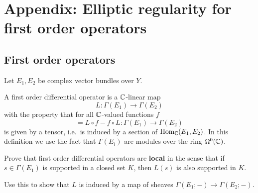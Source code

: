 \section*{\textbf{Appendix: Elliptic regularity for first order
    operators}}
\subsection*{First order operators}
\begin{defn}
  Let $E_{1},E_{2}$ be complex vector bundles over $Y$.
  
  A first order differential operator is a $\mathbb{C}$-linear map
  \begin{equation*}
    L:\Gamma(E_{1})\to \Gamma(E_{2})
  \end{equation*}
  with the property that for all $\mathbb{C}$-valued functions $f$
  \begin{equation*}
    [L,f]=L\circ f-f\circ L:\Gamma(E_{1})\to \Gamma(E_{2})
  \end{equation*}
  is given by a tensor, i.e.\ is induced by a section of $\operatorname{\mathrm{Hom}}_{\mathbb{C}}(E_{1},E_{2})$. In this definition we use the fact that $\Gamma(E_{i})$ are modules over the ring $\Omega^{0}(\mathbb{C})$.  
\end{defn}
\begin{xca}
  Prove that first order differential operators are \textbf{local} in the sense that if $s\in \Gamma(E_{1})$ is supported in a closed set $K$, then $L(s)$ is also supported in $K$.

  Use this to show that $L$ is induced by a map of sheaves $\Gamma(E_{1};-)\to \Gamma(E_{2};-)$.
\end{xca} 
